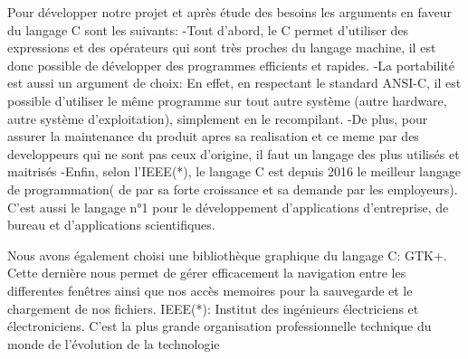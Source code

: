 \documentclass[a4]{article}
\begin{document}
Pour développer notre projet et après étude des besoins les arguments en faveur du langage C sont les suivants:
-Tout d'abord, le C permet d'utiliser des expressions et des opérateurs qui sont très proches du langage machine, 
il est donc possible de développer des programmes efficients et rapides.
-La portabilité est aussi un argument de choix: En effet, en respectant le standard ANSI-C, il est possible d'utiliser
le même programme sur tout autre système (autre hardware, autre système d'exploitation), simplement en le recompilant.
-De plus, pour assurer la maintenance du produit apres sa realisation et ce meme par des developpeurs qui ne sont
pas ceux d'origine, il faut un langage des plus utilisés et maitrisés
-Enfin, selon l'IEEE(*), le langage C est depuis 2016 le meilleur langage de 
programmation( de par sa forte croissance et sa demande par les employeurs). C'est aussi le langage n°1 pour le développement
d’applications d’entreprise, de bureau et d'applications scientifiques.

Nous avons également choisi une bibliothèque graphique du langage C: GTK+. Cette dernière nous permet de gérer efficacement
la navigation entre les differentes fenêtres
ainsi que nos accès memoires pour la sauvegarde et le chargement de nos fichiers. 
IEEE(*):  Institut des ingénieurs électriciens et électroniciens.
C'est la plus grande organisation professionnelle technique du monde de l'évolution de la technologie
\end{document}
